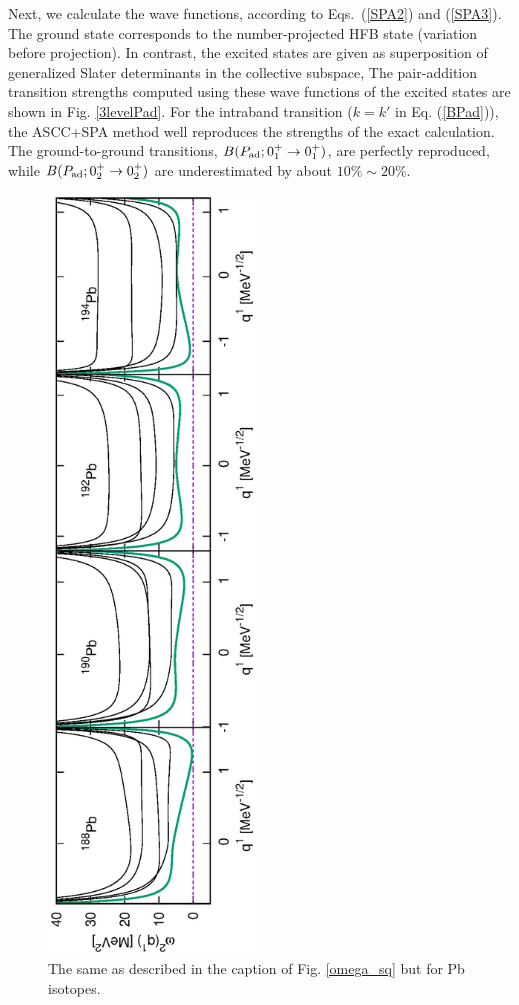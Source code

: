 \documentclass[11pt]{book} %
\begin{document}
Next, we calculate the wave functions,
according to Eqs.~(\ref{SPA2}) and (\ref{SPA3}).
The ground state corresponds to the number-projected HFB state
(variation before projection).
In contrast, the excited states are given as superposition of
generalized Slater determinants in the collective subspace,
The pair-addition transition strengths
computed using these wave functions of the excited states
are shown in Fig. \ref{3levelPad}.
For the intraband transition ($k=k'$ in Eq. (\ref{BPad})),
the ASCC+SPA method well reproduces the strengths of the exact calculation.
The ground-to-ground transitions, $B(P_{\rm ad};0_1^+\rightarrow 0_1^+)$, 
are perfectly reproduced, while
$B(P_{\rm ad};0_2^+\rightarrow 0_2^+)$ are underestimated 
by about $10\%\sim20\%$.
\begin{figure}[tb]
 \begin{center}
  \includegraphics[width=55mm,angle=-90]{images/Pbomega_sq.eps}
 \end{center}
	\caption{The same as described in the caption of Fig. \ref{omega_sq} but for Pb isotopes.
}
 \label{Pb_omega_sq}
\end{figure}
\end{document}
